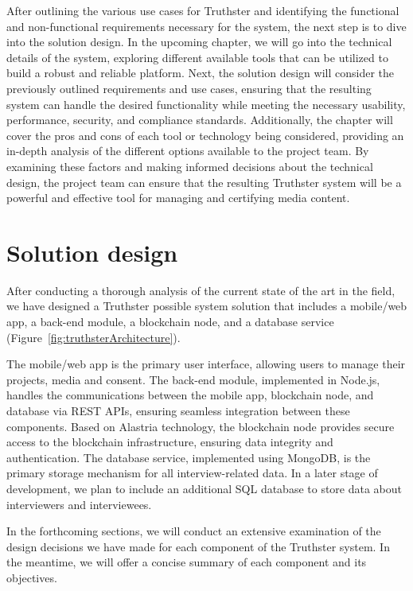 \documentclass[target=mst,aauheader=]{thud}
\begin{document}
After outlining the various use cases for Truthster and identifying the functional and non-functional requirements necessary for the system, the next step is to dive into the solution design. In the upcoming chapter, we will go into the technical details of the system, exploring different available tools that can be utilized to build a robust and reliable platform. Next, the solution design will consider the previously outlined requirements and use cases, ensuring that the resulting system can handle the desired functionality while meeting the necessary usability, performance, security, and compliance standards. Additionally, the chapter will cover the pros and cons of each tool or technology being considered, providing an in-depth analysis of the different options available to the project team. By examining these factors and making informed decisions about the technical design, the project team can ensure that the resulting Truthster system will be a powerful and effective tool for managing and certifying media content.







\chapter{Solution design}
\label{chapter:solutionDesign}

After conducting a thorough analysis of the current state of the art in the field, we have designed a Truthster possible system solution that includes a mobile/web app, a back-end module, a blockchain node, and a database service (Figure~\ref{fig:truthsterArchitecture}).

The mobile/web app is the primary user interface, allowing users to manage their projects, media and consent. The back-end module, implemented in Node.js, handles the communications between the mobile app, blockchain node, and database via REST APIs, ensuring seamless integration between these components. Based on Alastria technology, the blockchain node provides secure access to the blockchain infrastructure, ensuring data integrity and authentication. The database service, implemented using MongoDB, is the primary storage mechanism for all interview-related data. In a later stage of development, we plan to include an additional SQL database to store data about interviewers and interviewees.

In the forthcoming sections, we will conduct an extensive examination of the design decisions we have made for each component of the Truthster system. In the meantime, we will offer a concise summary of each component and its objectives.
\end{document}
